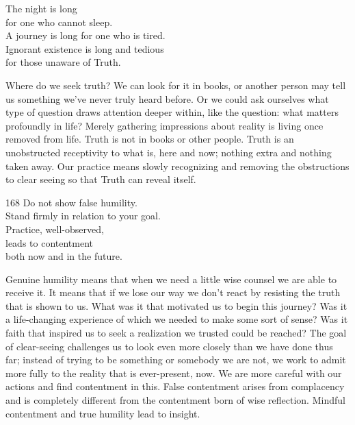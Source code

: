 
\begin{dhpVerse}{60}
\label{dhp-60}
The night is long\\
for one who cannot sleep.\\
A journey is long for one who is tired.\\
Ignorant existence is long and tedious\\
for those unaware of Truth.
\end{dhpVerse}

\begin{dhpRefl}
Where do we seek truth? We can look for it in books, or another person may tell us something we've never truly heard before. Or we could ask ourselves what type of question draws attention deeper within, like the question: what matters profoundly in life? Merely gathering impressions about reality is living once removed from life. Truth is not in books or other people. Truth is an unobstructed receptivity to what is, here and now; nothing extra and nothing taken away. Our practice means slowly recognizing and removing the obstructions to clear seeing so that Truth can reveal itself.
\end{dhpRefl}


\begin{dhpVerse}{168}
\label{dhp-168}
Do not show false humility.\\
Stand firmly in relation to your goal.\\
Practice, well-observed,\\
leads to contentment\\
both now and in the future.
\end{dhpVerse}

\begin{dhpRefl}
Genuine humility means that when we need a little wise counsel we are able to receive it. It means that if we lose our way we don't react by resisting the truth that is shown to us. What was it that motivated us to begin this journey? Was it a life-changing experience of which we needed to make some sort of sense? Was it faith that inspired us to seek a realization we trusted could be reached? The goal of clear-seeing challenges us to look even more closely than we have done thus far; instead of trying to be something or somebody we are not, we work to admit more fully to the reality that is ever-present, now. We are more careful with our actions and find contentment in this. False contentment arises from complacency and is completely different from the contentment born of wise reflection. Mindful contentment and true humility lead to insight.
\end{dhpRefl}

